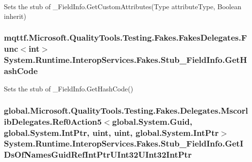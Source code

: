 Sets the stub of \-\_\-\-Field\-Info.\-Get\-Custom\-Attributes(\-Type attribute\-Type, Boolean inherit)

\hypertarget{class_system_1_1_runtime_1_1_interop_services_1_1_fakes_1_1_stub___field_info_a3f042fa893056f051c27b3162de14624}{
\subsubsection[{Get\-Hash\-Code}]{\setlength{\rightskip}{0pt plus 5cm}mqttf.\-Microsoft.\-Quality\-Tools.\-Testing.\-Fakes.\-Fakes\-Delegates.\-Func$<$int$>$ System.\-Runtime.\-Interop\-Services.\-Fakes.\-Stub\-\_\-\-Field\-Info.\-Get\-Hash\-Code}}\label{class_system_1_1_runtime_1_1_interop_services_1_1_fakes_1_1_stub___field_info_a3f042fa893056f051c27b3162de14624}


Sets the stub of \-\_\-\-Field\-Info.\-Get\-Hash\-Code()

\hypertarget{class_system_1_1_runtime_1_1_interop_services_1_1_fakes_1_1_stub___field_info_a3d99b5a3ebeec78b458bbb670aa8ae9a}{
\subsubsection[{Get\-I\-Ds\-Of\-Names\-Guid\-Ref\-Int\-Ptr\-U\-Int32\-U\-Int32\-Int\-Ptr}]{\setlength{\rightskip}{0pt plus 5cm}global.\-Microsoft.\-Quality\-Tools.\-Testing.\-Fakes.\-Delegates.\-Mscorlib\-Delegates.\-Ref0\-Action5$<$global.\-System.\-Guid, global.\-System.\-Int\-Ptr, uint, uint, global.\-System.\-Int\-Ptr$>$ System.\-Runtime.\-Interop\-Services.\-Fakes.\-Stub\-\_\-\-Field\-Info.\-Get\-I\-Ds\-Of\-Names\-Guid\-Ref\-Int\-Ptr\-U\-Int32\-U\-Int32\-Int\-Ptr}}\label{class_system_1_1_runtime_1_1_interop_services_1_1_fakes_1_1_stub___field_info_a3d99b5a3ebeec78b458bbb670aa8ae9a}


